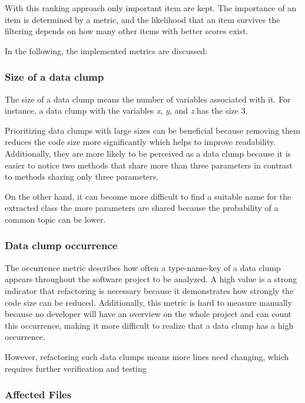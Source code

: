 With this ranking approach only important item are kept. The importance of an item is determined by a metric, and the likelihood that an item survives the filtering depends on how many other items with better scores exist.

In the following, the implemented metrics are discussed:

\subsubsection{Size of a data clump}

The size of a data clump means the number of variables associated with it. For instance, a data clump with the variables \textit{x}, \textit{y}, and \textit{z} has the size 3. 

Prioritizing data clumps with large sizes can be beneficial because removing them reduces the code size more significantly which helps to improve readability. Additionally, they are more likely to be perceived as a data clump because it is easier to notice two methods that share more than three parameters in contrast to methods sharing only three parameters. 

On the other hand,  it can become more difficult to find a suitable name for the extracted class the more parameters are shared because the probability of a common topic can be lower. 

\subsubsection{Data clump occurrence}

The occurrence metric describes how often a type-name-key of a data clump appears throughout the software project to be analyzed. A high value is a strong indicator that refactoring is necessary because it demonstrates how strongly the code size can be reduced. Additionally, this metric is hard to measure manually because no developer will have an overview on the whole project and can count this occurrence, making it more difficult to realize that a data clump has a high occurrence.  

However, refactoring such data clumps means more lines need changing, which requires further verification and testing

\subsubsection{Affected Files}

